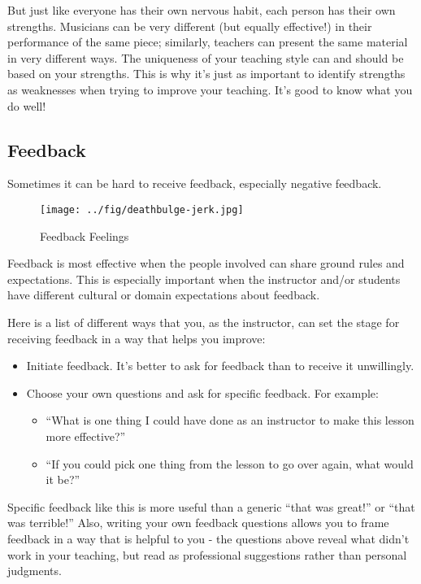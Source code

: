 But just like everyone has their own nervous habit, each person has
their own strengths. Musicians can be very different (but equally
effective!) in their performance of the same piece; similarly, teachers
can present the same material in very different ways. The uniqueness of
your teaching style can and should be based on your strengths. This is
why it's just as important to identify strengths as weaknesses when
trying to improve your teaching. It's good to know what you do well!

\subsection{Feedback}\label{feedback}

Sometimes it can be hard to receive feedback, especially negative
feedback.

\begin{figure}[htbp]
\centering
\texttt{[image: ../fig/deathbulge-jerk.jpg]}
\caption{Feedback Feelings}
\end{figure}

Feedback is most effective when the people involved can share ground
rules and expectations. This is especially important when the instructor
and/or students have different cultural or domain expectations about
feedback.

Here is a list of different ways that you, as the instructor, can set
the stage for receiving feedback in a way that helps you improve:

\begin{itemize}
\item
  Initiate feedback. It's better to ask for feedback than to receive it
  unwillingly.
\item
  Choose your own questions and ask for specific feedback. For example:

  \begin{itemize}
  \itemsep1pt\parskip0pt
  \item
    ``What is one thing I could have done as an instructor to make this
    lesson more effective?''
  \item
    ``If you could pick one thing from the lesson to go over again, what
    would it be?''
  \end{itemize}
\end{itemize}

Specific feedback like this is more useful than a generic ``that was
great!'' or ``that was terrible!'' Also, writing your own feedback
questions allows you to frame feedback in a way that is helpful to you -
the questions above reveal what didn't work in your teaching, but read
as professional suggestions rather than personal judgments.


